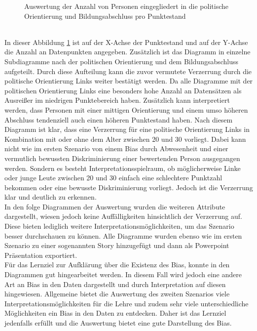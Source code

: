 \begin{onehalfspace}
\begin{figure}[h]
    \caption{Auswertung der Anzahl von Personen eingegliedert in die politische Orientierung und Bildungsabschluss pro Punktestand}
    \label{fig:TabPoint4}
\end{figure}\\
In dieser Abbildung \ref{fig:TabPoint4} ist auf der X-Achse der Punktestand und auf der Y-Achse die Anzahl an Datenpunkten angegeben. Zusätzlich ist das Diagramm in einzelne Subdiagramme nach der politischen Orientierung und dem Bildungsabschluss aufgeteilt. Durch diese Aufteilung kann die zuvor vermutete Verzerrung durch die politische Orientierung Links weiter bestätigt werden. Da alle Diagramme mit der politischen Orientierung Links eine besonders hohe Anzahl an Datensätzen als Ausreißer im niedrigen Punktebereich haben. Zusätzlich kann interpretiert werden, dass Personen mit einer mittigen Orientierung und einem umso höheren Abschluss tendenziell auch einen höheren Punktestand haben. Nach diesem Diagramm ist klar, dass eine Verzerrung für eine politische Orientierung Links in Kombination mit oder ohne dem Alter zwischen 20 und 30 vorliegt. Dabei kann nicht wie im ersten Szenario von einem Bias durch Abwesenheit und einer vermutlich bewussten Diskriminierung einer bewertenden Person ausgegangen werden. Sondern es besteht Interpretationsspielraum, ob möglicherweise Linke oder junge Leute zwischen 20 und 30 einfach eine schlechtere Punktzahl bekommen oder eine bewusste Diskriminierung vorliegt. Jedoch ist die Verzerrung klar und deutlich zu erkennen.\\
In den folge Diagrammen der Auswertung wurden die weiteren Attribute dargestellt, wiesen jedoch keine Auffälligkeiten hinsichtlich der Verzerrung auf. Diese bieten lediglich weitere Interpretationsmöglichkeiten, um das Szenario besser durchschauen zu können. Alle Diagramme wurden ebenso wie im ersten Szenario zu einer sogenannten Story hinzugefügt und dann als Powerpoint Präsentation exportiert.\\
Für das Lernziel zur Aufklärung über die Existenz des Bias, konnte in den Diagrammen gut hingearbeitet werden. In diesem Fall wird jedoch eine andere Art an Bias in den Daten dargestellt und durch Interpretation auf diesen hingewiesen. Allgemeine bietet die Auswertung des zweiten Szenarios viele Interpretationsmöglichkeiten für die Lehre und zudem sehr viele unterschiedliche Möglichkeiten ein Bias in den Daten zu entdecken. Daher ist das Lernziel jedenfalls erfüllt und die Auswertung bietet eine gute Darstellung des Bias.
\newpage

\end{onehalfspace}
